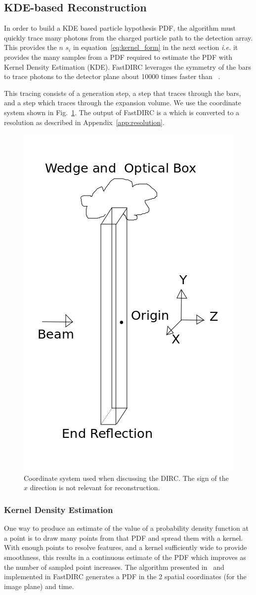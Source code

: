 \subsection{KDE-based Reconstruction}
\label{sec:kde}

In order to build a KDE based particle hypothesis PDF, the algorithm must quickly trace many photons from the charged particle path to the detection array.  This provides the $n$ $s_{i}$ in equation~\eqref{eq:kernel_form} in the next section {\em i.e.} it provides the many samples from a PDF required to estimate the PDF with Kernel Density Estimation (KDE).  FastDIRC leverages the symmetry of the bars to trace photons to the detector plane about 10000 times faster than \geant~\cite{Hardin:2016cvu}.

This tracing consists of a generation step, a step that traces through the bars, and a step which traces through the expansion volume.  We use the coordinate system shown in Fig.~\ref{pic:coord}.  The output of FastDIRC is a \deltall which is converted to a resolution as described in Appendix~\ref{app:resolution}.

\begin{figure}[!h]
  \begin{center}
    \includegraphics[width=.35\textwidth]{pics/billi.png}
    \caption{\label{pic:coord} 
      Coordinate system used when discussing the DIRC.  The sign of the $x$ direction is not relevant for reconstruction.}
  \end{center}
\end{figure}

\subsubsection*{Kernel Density Estimation}

One way to produce an estimate of the value of a probability density function at a point is to draw many points from that PDF and spread them with a kernel.  With enough points to resolve features, and a kernel sufficiently wide to provide smoothness, this results in a continuous estimate of the PDF which improves as the number of sampled point increases.  The algorithm presented in~\cite{Hardin:2016cvu} and implemented in FastDIRC generates a PDF in the 2 spatial coordinates (for the image plane) and time.

